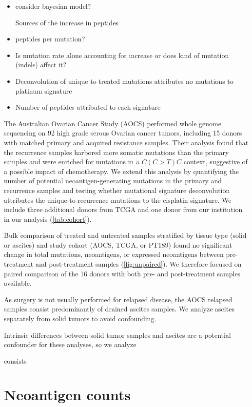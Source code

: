 \begin{itemize}
\item consider bayesian model?

Sources of the increase in peptides
\item peptides per mutation?
\item Is mutation rate alone accounting for increase or does kind of mutation (indels) affect it?

\item Deconvolution of unique to treated mutations attributes no mutations to platinum signature
\item Number of peptides attributed to each signature
\end{itemize}

The Australian Ovarian Cancer Study (AOCS)\cite{Patch_2015} performed whole genome sequencing on 92 high grade serous Ovarian cancer tumors, including 15 donors with matched primary and acquired resistance samples. Their analysis found that the recurrence samples harbored more somatic mutations than the primary samples and were enriched for mutations in a $C(C \gt T)C$ context, suggestive of a possible impact of chemotherapy. We extend this analysis by quantifying the number of potential neoantigen-generating mutations in the primary and recurrence samples and testing whether mutational signature deconvolution attributes the unique-to-recurrence mutations to the  cisplatin signature. We include three additional donors from TCGA and one donor from our institution in our analysis (\ref{tab:cohort}).

Bulk comparison of treated and untreated samples stratified by tissue type (solid or ascites) and study cohort (AOCS, TCGA, or PT189) found no significant change in total mutations, neoantigens, or expressed neoantigens between pre-treatment and post-treatment samples (\ref{fig:unpaired}). We therefore focused on paired comparison of the 16 donors with both pre- and post-treatment samples available. 

As surgery is not usually performed for relapsed disease, the AOCS relapsed samples consist predominantly of drained ascites samples. We analyze ascites separately from solid tumors to avoid confounding. 


Intrinsic differences between solid tumor samples and ascites are a potential confounder for these analyses, so we analyze 

consists 

\section*{Neoantigen counts}


